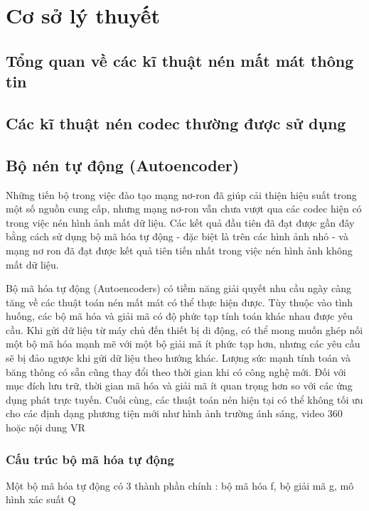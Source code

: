 \chapter{Cơ sở lý thuyết}
\label{cha: chap2}

\section{Tổng quan về các kĩ thuật nén mất mát thông tin}

\section{Các kĩ thuật nén codec thường được sử dụng}

\section{Bộ nén tự động (Autoencoder)}

Những tiến bộ trong việc đào tạo mạng nơ-ron đã giúp cải thiện hiệu suất
trong một số nguồn cung cấp, nhưng mạng nơ-ron vẫn chưa vượt qua các codec
hiện có trong việc nén hình ảnh mất dữ liệu. Các kết quả đầu tiên đã đạt
được gần đây bằng cách sử dụng bộ mã hóa tự động - đặc biệt là trên các hình ảnh nhỏ
- và mạng nơ ron đã đạt được kết quả tiên tiến nhất trong việc nén hình ảnh
không mất dữ liệu.

Bộ mã hóa tự động (Autoencoders) có tiềm năng giải quyết nhu cầu ngày càng
tăng về các thuật
toán nén mất mát có thể thực hiện được. Tùy thuộc vào tình huống,
các bộ mã hóa và giải mã có độ phức tạp tính toán khác nhau được yêu cầu.
Khi gửi dữ liệu từ máy chủ đến thiết bị di động, có thể mong muốn ghép nối
một bộ mã hóa mạnh mẽ với một bộ giải mã ít phức tạp hơn, nhưng các yêu cầu
sẽ bị đảo ngược khi gửi dữ liệu theo hướng khác. Lượng sức mạnh tính toán và
băng thông có sẵn cũng thay đổi theo thời gian khi có công nghệ mới.
Đối với mục đích lưu trữ, thời gian mã hóa và giải mã ít quan trọng hơn
so với các ứng dụng phát trực tuyến. Cuối cùng, các thuật toán nén hiện
tại có thể không tối ưu cho các định dạng phương tiện mới như hình ảnh
trường ánh sáng, video 360 hoặc nội dung VR

\subsection{Cấu trúc bộ mã hóa tự động}
Một bộ mã hóa tự động có 3 thành phần chính : bộ mã hóa f, 
bộ giải mã g, mô hình xác suất Q



